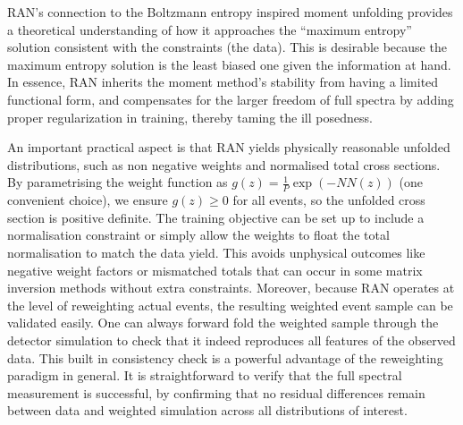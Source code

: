{{        RAN's connection to the Boltzmann entropy inspired moment unfolding provides a theoretical understanding of how it approaches the ``maximum entropy'' solution consistent with the constraints (the data).
        This is desirable because the maximum entropy solution is the least biased one given the information at hand.
        In essence, RAN inherits the moment method's stability from having a limited functional form, and compensates for the larger freedom of full spectra by adding proper regularization in training, thereby taming the ill posedness.

        An important practical aspect is that RAN yields physically reasonable unfolded distributions, such as non negative weights and normalised total cross sections.
        By parametrising the weight function as $g({z}) = \frac1P\exp(-NN({z}))$ (one convenient choice), we ensure $g({z})\ge 0$ for all events, so the unfolded cross section is positive definite.
        The training objective can be set up to include a normalisation constraint or simply allow the weights to float the total normalisation to match the data yield.
        This avoids unphysical outcomes like negative weight factors or mismatched totals that can occur in some matrix inversion methods without extra constraints.
        Moreover, because RAN operates at the level of reweighting actual events, the resulting weighted event sample can be validated easily.
        One can always forward fold the weighted sample through the detector simulation to check that it indeed reproduces all features of the observed data.
        This built in consistency check is a powerful advantage of the reweighting paradigm in general.
        It is straightforward to verify that the full spectral measurement is successful, by confirming that no residual differences remain between data and weighted simulation across all distributions of interest.

}}
